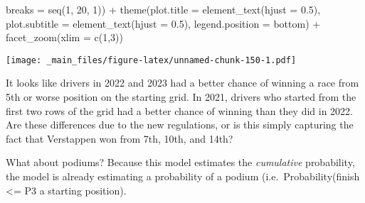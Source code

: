 \documentclass[
]{book}
\newenvironment{Shaded}{\begin{snugshade}}{\end{snugshade}}
\newcommand{\AttributeTok}[1]{\textcolor[rgb]{0.77,0.63,0.00}{#1}}
\newcommand{\DecValTok}[1]{\textcolor[rgb]{0.00,0.00,0.81}{#1}}
\newcommand{\FloatTok}[1]{\textcolor[rgb]{0.00,0.00,0.81}{#1}}
\newcommand{\FunctionTok}[1]{\textcolor[rgb]{0.00,0.00,0.00}{#1}}
\newcommand{\NormalTok}[1]{#1}
\newcommand{\SpecialCharTok}[1]{\textcolor[rgb]{0.00,0.00,0.00}{#1}}
\newcommand{\StringTok}[1]{\textcolor[rgb]{0.31,0.60,0.02}{#1}}
\begin{document}
\begin{Shaded}
\begin{Highlighting}[]
                     \AttributeTok{breaks =} \FunctionTok{seq}\NormalTok{(}\DecValTok{1}\NormalTok{, }\DecValTok{20}\NormalTok{, }\DecValTok{1}\NormalTok{)) }\SpecialCharTok{+}
  \FunctionTok{theme}\NormalTok{(}\AttributeTok{plot.title =} \FunctionTok{element\_text}\NormalTok{(}\AttributeTok{hjust =} \FloatTok{0.5}\NormalTok{),}
        \AttributeTok{plot.subtitle =} \FunctionTok{element\_text}\NormalTok{(}\AttributeTok{hjust =} \FloatTok{0.5}\NormalTok{),}
        \AttributeTok{legend.position =} \StringTok{\textquotesingle{}bottom\textquotesingle{}}\NormalTok{) }\SpecialCharTok{+}
  \FunctionTok{facet\_zoom}\NormalTok{(}\AttributeTok{xlim =} \FunctionTok{c}\NormalTok{(}\DecValTok{1}\NormalTok{,}\DecValTok{3}\NormalTok{))}
\end{Highlighting}
\end{Shaded}

\texttt{[image: \_main\_files/figure-latex/unnamed-chunk-150-1.pdf]}

It looks like drivers in 2022 and 2023 had a better chance of winning a race from 5th or worse position on the starting grid. In 2021, drivers who started from the first two rows of the grid had a better chance of winning than they did in 2022. Are these differences due to the new regulations, or is this simply capturing the fact that Verstappen won from 7th, 10th, and 14th?

What about podiums? Because this model estimates the \emph{cumulative} probability, the model is already estimating a probability of a podium (i.e.~Probability(finish \textless= P3 \textbar{} a starting position).
\end{document}
